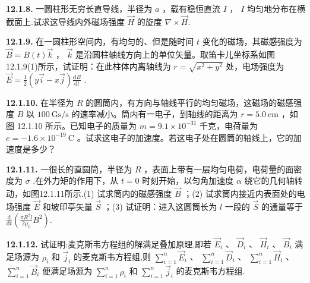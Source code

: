 \vfill
\newpage

\textbf{12.1.8.} 一圆柱形无穷长直导线，半径为 $a$ ，载有稳恒直流 $I$ ， $I$ 均匀地分布在横截面上.试求这导线内外磁场强度 $\vec{H}$ 的旋度 $\nabla \times \vec{H}$.

\vfill
\newpage

\textbf{12.1.9.} 在一圆柱形空间内，有均匀的、但是随时间 $t$ 变化的磁场，其磁感强度为 $\vec{B} = B(t)\vec{k}$ ， $\vec{k}$ 是沿圆柱轴线方向上的单位矢量。取笛卡儿坐标系如图12.1.9(1)所示，试证明：在此柱体内离轴线为 $r = \sqrt{x^2 + y^2}$ 处，电场强度为 $\displaystyle \vec{E} = \frac{1}{2}(y\vec{i} - x\vec{j})\frac{\mathrm{d}B}{\mathrm{d}t}$ .

\begin{center}
\end{center}

\vfill
\newpage

\textbf{12.1.10.} 在半径为 $R$ 的圆筒内，有方向与轴线平行的均匀磁场，这磁场的磁感强度 $B$ 以 $100\mathrm{~Gs/s}$ 的速率减小。筒内有一电子，到轴线的距离为 $r = 5.0\mathrm{~cm}$ ，如图 12.1.10 所示。已知电子的质量为 $m = 9.1 \times 10^{-31}$ 千克，电荷量为 $e = -1.6 \times 10^{-19}\mathrm{~C}$ 。试求这电子的加速度。若这电子处在圆筒的轴线上，它的加速度是多少？

\begin{center}
\end{center}

\vfill
\newpage

\textbf{12.1.11.} 一很长的直圆筒，半径为 $R$ ，表面上带有一层均匀电荷，电荷量的面密度为 $\sigma$ .在外力矩的作用下，从 $t = 0$ 时刻开始，以匀角加速度 $\alpha$ 绕它的几何轴转动，如图12.1.11所示.(1) 试求筒内的磁感强度 $\vec{B}$ ；(2) 试求筒内接近内表面处的电场强度 $\vec{E}$ 和坡印亭矢量 $\vec{S}$ ；(3) 试证明：进入这圆筒长为 $l$ 一段的 $\vec{S}$ 的通量等于 $\displaystyle \frac{\mathrm{d}}{\mathrm{d}t}\left(\frac{\pi R^2l}{2\mu_0} B^2\right)$.

\begin{center}
\end{center}

\vfill
\newpage

\textbf{12.1.12.} 试证明:麦克斯韦方程组的解满足叠加原理,即若 $\vec{E}_{i}$ 、 $\vec{D}_{i}$ 、 $\vec{H}_{i}$ 、 $\vec{B}_{i}$ 满足场源为 $\rho_{i}$ 和 $\vec{j}_{i}$ 的麦克斯韦方程组,则 $\displaystyle \sum_{i=1}^{n} \vec{E}_{i}$ 、 $\displaystyle \sum_{i=1}^{n} \vec{D}_{i}$ 、 $\displaystyle \sum_{i=1}^{n} \vec{H}_{i}$ 、 $\displaystyle \sum_{i=1}^{n} \vec{B}_{i}$ 便满足场源为 $\displaystyle \sum_{i=1}^{n} \rho_{i}$ 和 $\displaystyle \sum_{i=1}^{n} \vec{j}_{i}$ 的麦克斯韦方程组.

